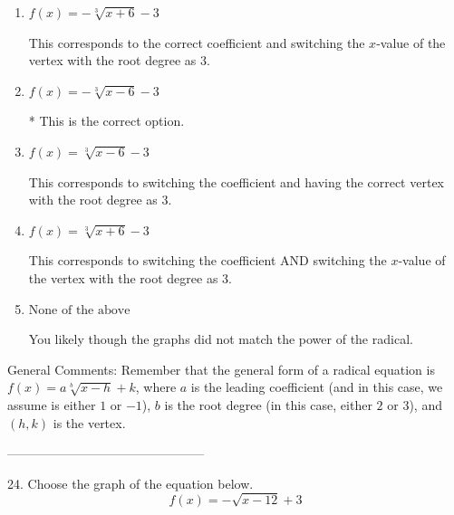 \documentclass{extbook}[14pt]
\begin{document}
\begin{enumerate}[label=\Alph*.] 
\item $ f(x) = - \sqrt[3]{x + 6} - 3 $ 

 This corresponds to the correct coefficient and switching the $x$-value of the vertex with the root degree as $3$. 
\item $ f(x) = - \sqrt[3]{x - 6} - 3 $ 

 * This is the correct option. 
\item $ f(x) = \sqrt[3]{x - 6} - 3 $ 

 This corresponds to switching the coefficient and having the correct vertex with the root degree as $3$. 
\item $ f(x) = \sqrt[3]{x + 6} - 3 $ 

 This corresponds to switching the coefficient AND switching the $x$-value of the vertex with the root degree as $3$. 
\item $ \text{None of the above} $ 

 You likely though the graphs did not match the power of the radical. 
\end{enumerate} 
 
General Comments: Remember that the general form of a radical equation is $ f(x) = a \sqrt[b]{x - h} + k$, where $a$ is the leading coefficient (and in this case, we assume is either $1$ or $-1$), $b$ is the root degree (in this case, either $2$ or $3$), and $(h, k)$ is the vertex.

-----------------------------------------------

24. Choose the graph of the equation below.
\[ f(x) = - \sqrt{x - 12} + 3 \] 
\end{document}
